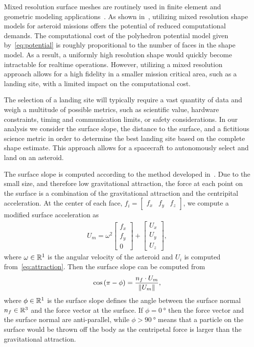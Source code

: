 Mixed resolution surface meshes are routinely used in finite element and geometric modeling applications~\cite{botsch2010}.
As shown in~\cite{mcmahon2017}, utilizing mixed resolution shape models for asteroid missions offers the potential of reduced computational demands.
The computational cost of the polyhedron potential model given by~\cref{eq:potential} is roughly proporitional to the number of faces in the shape model.
As a result, a uniformly high resolution shape would quickly become intractable for realtime operations.
However, utilizing a mixed resolution approach allows for a high fidelity in a smaller mission critical area, such as a landing site, with a limited impact on the computational cost.

The selection of a landing site will typically require a vast quantity of data and weigh a multitude of possible metrics, such as scientific value, hardware constraints, timing and communication limits, or safety considerations. 
In our analysis we consider the surface slope, the distance to the surface, and a fictitious science metric in order to determine the best landing site based on the complete shape estimate.
This approach allows for a spacecraft to autonomously select and land on an asteroid.

The surface slope is computed according to the method developed in~\cite{scheeres1996}.
Due to the small size, and therefore low gravitational attraction, the force at each point on the surface is a combination of the gravitational attraction and the centripital acceleration.
At the center of each face, \( f_i = \begin{bmatrix} f_x & f_y & f_z \end{bmatrix} \), we compute a modified surface acceleration as
\begin{align}\label{eq:surface_force}
    U_m = \omega^2 \begin{bmatrix} f_x \\ f_y \\ 0 \end{bmatrix} + \begin{bmatrix} U_x \\ U_y \\ U_z \end{bmatrix},
\end{align}
where \( \omega \in \mathbb{R}^1 \) is the angular velocity of the asteroid and \( U_i \) is computed from~\cref{eq:attraction}.
Then the surface slope can be computed from
\begin{align}\label{eq:surface_slope}
    \cos \left(  \pi - \phi  \right) = \frac{n_f \cdot U_m}{\left\| U_m \right\|},
\end{align}
where \( \phi \in \mathbb{R}^1 \) is the surface slope defines the angle between the surface normal \( n_f \in \mathbb{R}^3 \) and the force vector at the surface.
If \( \phi = \SI{0}{\degree} \) then the force vector and the surface normal are anti-parallel, while \( \phi > \SI{90}{\degree} \) means that a particle on the surface would be thrown off the body as the centripetal force is larger than the gravitational attraction.

